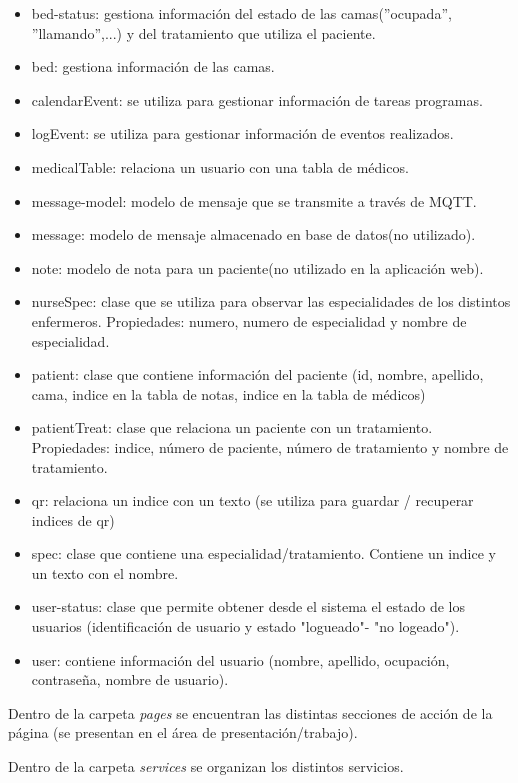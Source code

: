 \begin{itemize}
\item bed-status: gestiona información del estado de las camas(''ocupada'', ''llamando'',...) y del tratamiento que utiliza el paciente.
\item bed: gestiona información de las camas.
\item calendarEvent: se utiliza para gestionar información de tareas programas.
\item logEvent: se utiliza para gestionar información de eventos realizados.
\item medicalTable: relaciona un usuario con una tabla de médicos.
\item message-model: modelo de mensaje que se transmite a través de MQTT.
\item message: modelo de mensaje almacenado en base de datos(no utilizado).
\item note: modelo de nota para un paciente(no utilizado en la aplicación web).
\item nurseSpec: clase que se utiliza para observar las especialidades de los distintos enfermeros. Propiedades: numero, numero de especialidad y nombre de especialidad.
\item patient: clase que contiene información del paciente (id, nombre, apellido, cama, indice en la tabla de notas, indice en la tabla de médicos)
\item patientTreat: clase que relaciona un paciente con un tratamiento. Propiedades: indice, número de paciente, número de tratamiento y nombre de tratamiento.
\item qr: relaciona un indice con un texto (se utiliza para guardar / recuperar indices de qr)
\item spec: clase que contiene una especialidad/tratamiento. Contiene un indice y un texto con el nombre.
\item user-status: clase que permite obtener desde el sistema el estado de los usuarios (identificación de usuario y estado "logueado"- "no logeado").
\item user: contiene información del usuario (nombre, apellido, ocupación, contraseña, nombre de usuario).
 
\end{itemize}


Dentro de la carpeta \textit{pages} se encuentran las distintas secciones de acción de la página (se presentan en el área de presentación/trabajo).

Dentro de la carpeta \textit{services} se organizan los distintos servicios.

